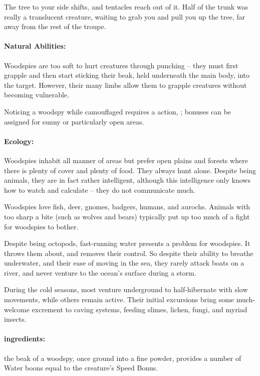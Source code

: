 \begin{multicols}{2}
\begin{boxtext}
  The tree to your side shifts, and tentacles reach out of it.
  Half of the trunk was really a translucent creature, waiting to grab you and pull you up the tree, far away from the rest of the troupe.
\end{boxtext}

\paragraph{Natural Abilities:} Woodspies are too soft to hurt creatures through punching -- they must first grapple and then start sticking their beak, held underneath the main body, into the target.
However, their many limbs allow them to grapple creatures without becoming vulnerable.%

Noticing a woodspy while camouflaged requires a  action, \tn[14]; bonuses can be assigned for sunny or particularly open areas.

\woodspy

\paragraph{Ecology:} Woodspies inhabit all manner of areas but prefer open plains and forests where there is plenty of cover and plenty of food.  They always hunt alone.  Despite being animals, they are in fact rather intelligent, although this intelligence only knows how to watch and calculate -- they do not communicate much.

Woodspies love fish, deer, gnomes, badgers, humans, and aurochs.
Animals with too sharp a bite (such as wolves and bears) typically put up too much of a fight for woodspies to bother.

Despite being octopods, fast-running water presents a problem for woodspies.
It throws them about, and removes their control.
So despite their ability to breathe underwater, and their ease of moving in the sea, they rarely attack boats on a river, and never venture to the ocean's surface during a storm.

During the cold seasons, most venture underground to half-hibernate with slow movements, while others remain active.
Their initial excursions bring some much-welcome excrement to caving systems, feeding slimes, lichen, fungi, and myriad insects.

\paragraph{\Glspl{ingredient}:}
the beak of a woodspy, once ground into a fine powder, provides a number of Water \glspl{boon} equal to the creature's Speed Bonus.


\end{multicols}
